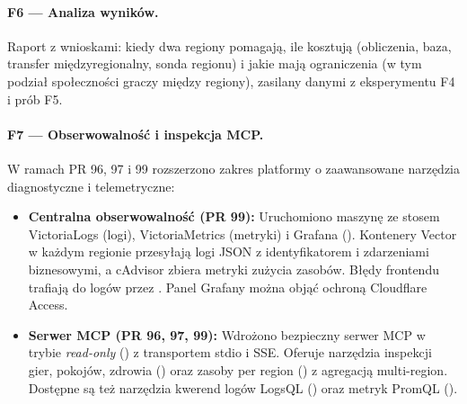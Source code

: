 \paragraph{F6 --- Analiza wyników.}
Raport z wnioskami: kiedy dwa regiony pomagają, ile kosztują (obliczenia, baza,
transfer międzyregionalny, sonda regionu) i jakie mają ograniczenia (w tym
podział społeczności graczy między regiony), zasilany danymi z eksperymentu F4 i
prób F5.

\paragraph{F7 --- Obserwowalność i inspekcja MCP.}
W ramach PR 96, 97 i 99 rozszerzono zakres platformy o zaawansowane narzędzia
diagnostyczne i telemetryczne:
\begin{itemize}
  \item \textbf{Centralna obserwowalność (PR 99):} Uruchomiono maszynę
         ze stosem VictoriaLogs (logi), VictoriaMetrics (metryki)
        i Grafana (). Kontenery Vector w każdym
        regionie przesyłają logi JSON z identyfikatorem  i
        zdarzeniami biznesowymi, a cAdvisor zbiera metryki zużycia zasobów. Błędy
        frontendu trafiają do logów przez . Panel Grafany
        można objąć ochroną Cloudflare Access.
  \item \textbf{Serwer MCP (PR 96, 97, 99):} Wdrożono bezpieczny serwer MCP w trybie
        \emph{read-only} () z transportem stdio i SSE.
        Oferuje narzędzia inspekcji gier, pokojów, zdrowia
        () oraz zasoby per region
        () z agregacją multi-region. Dostępne są też
        narzędzia kwerend logów LogsQL () oraz metryk PromQL
        ().
\end{itemize}

